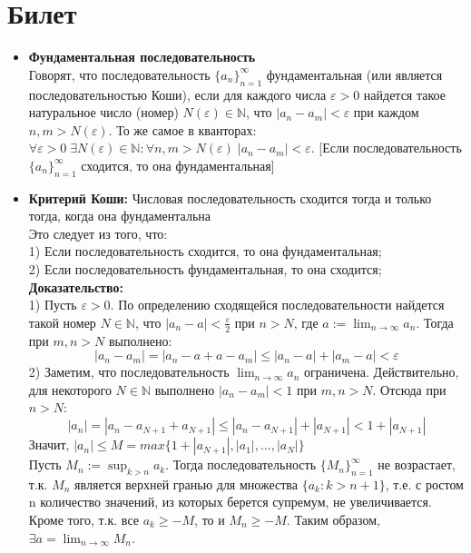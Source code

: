 \documentclass[12pt,a4paper]{article}
\begin{document}
\section{Билет}
\begin{itemize}

\item \textbf{Фундаментальная последовательность} \\
Говорят, что последовательность $\{a_n\}_{n=1}^{\infty}$ фундаментальная (или является последовательностью Коши), если для каждого числа $\varepsilon > 0$ найдется такое натуральное число (номер) $N(\varepsilon) \in \mathbb{N}$, что $|a_n - a_m| < \varepsilon$ при каждом $n, m > N(\varepsilon)$. То же самое в кванторах: $\forall \varepsilon > 0 \; \exists N(\varepsilon) \in \mathbb{N}: \forall n, m > N(\varepsilon) \; |a_n - a_m| < \varepsilon$.
[Если последовательность $\{a_n\}_{n=1}^{\infty}$ сходится, то она фундаментальная]

\item \textbf{Критерий Коши: }Числовая последовательность сходится тогда и только тогда, когда она фундаментальна \\
Это следует из того, что: \\
1) Если последовательность сходится, то она фундаментальная; \\
2) Если последовательность фундаментальная, то она сходится; \\
\textbf{Доказательство:} \\
1) Пусть $\varepsilon > 0$. По определению сходящейся последовательности найдется такой номер $N \in \mathbb{N}$, что $|a_n - a| < \frac{\varepsilon}{2}$ при $n > N$, где $a := \lim_{n \to \infty}{a_n}$. Тогда при $m, n > N$ выполнено:
\[
|a_n - a_m| = |a_n - a + a - a_m| \leq |a_n - a| + |a_m - a| < \varepsilon
\]
2) Заметим, что последовательность $\lim_{n \to \infty}{a_n}$ ограничена. Действительно, для некоторого $N \in \mathbb{N}$ выполнено $|a_n - a_m| < 1$ при $m, n > N$. Отсюда при $n > N$:
\[
|a_n| = |a_n - a_{N+1} + a_{N+1}| \leq |a_n - a_{N+1}| + |a_{N+1}| < 1 + |a_{N+1}|
\]
Значит, $|a_n| \leq M = max\{1 + |a_{N+1}|,|a_1|, ..., |a_N|\}$ \\
Пусть $M_n := \sup_{k > n}{a_k}$. Тогда последовательность $\{M_n\}_{n=1}^{\infty}$ не возрастает, т.к. $M_n$ является верхней гранью для множества $\{a_k: k > n+1\}$, т.е. с ростом n количество значений, из которых берется супремум, не увеличивается. Кроме того, т.к. все $a_k \geq -M$, то и $M_n \geq -M$. Таким образом, $\exists a = \lim_{n \to \infty}{M_n}$. 


\end{itemize}
\end{document}
